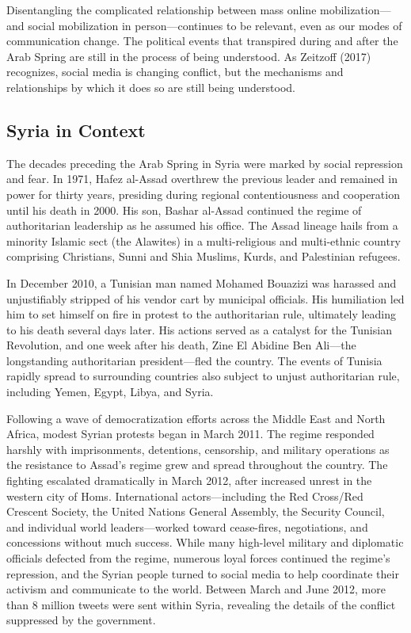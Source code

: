 \documentclass[
  english,
  man]{apa6}
\begin{document}
Disentangling the complicated relationship between mass online
mobilization---and social mobilization in person---continues to be relevant,
even as our modes of communication change. The political events that
transpired during and after the Arab Spring are still in the process of being
understood. As Zeitzoff (2017) recognizes, social media is
changing conflict, but the mechanisms and relationships by which it does so are
still being understood.

\hypertarget{syria-in-context}{%
\subsection{Syria in Context}\label{syria-in-context}}

The decades preceding the Arab Spring in Syria were marked by
social repression and fear. In 1971, Hafez al-Assad overthrew the previous
leader and remained in power for thirty years, presiding during
regional contentiousness and cooperation until his death in 2000. His son,
Bashar al-Assad continued the regime of authoritarian leadership as he assumed
his office. The Assad lineage hails from a minority Islamic sect (the Alawites)
in a multi-religious and multi-ethnic country comprising Christians, Sunni and
Shia Muslims, Kurds, and Palestinian refugees.

In December 2010, a Tunisian man named Mohamed Bouazizi was harassed and
unjustifiably stripped of his vendor cart by municipal officials. His
humiliation led him to set himself on fire in protest to the authoritarian rule,
ultimately leading to his death several days later. His actions served as a
catalyst for the Tunisian Revolution, and one week after his death, Zine El
Abidine Ben Ali---the longstanding authoritarian president---fled the country.
The events of Tunisia rapidly spread to surrounding countries also subject to
unjust authoritarian rule, including Yemen, Egypt, Libya, and Syria.

Following a wave of democratization efforts across the Middle East and North
Africa, modest Syrian protests began in March 2011. The regime responded harshly
with imprisonments, detentions, censorship, and military operations as the
resistance to Assad's regime grew and spread throughout the country. The
fighting escalated dramatically in March 2012, after increased unrest in the
western city of Homs. International actors---including the Red Cross/Red
Crescent Society, the United Nations General Assembly, the Security Council, and
individual world leaders---worked toward cease-fires, negotiations, and
concessions without much success. While many high-level military and diplomatic
officials defected from the regime, numerous loyal forces continued the regime's
repression, and the Syrian people turned to social media to help coordinate
their activism and communicate to the world. Between March and June 2012, more
than 8 million tweets were sent within Syria, revealing the details of the
conflict suppressed by the government.
\end{document}
